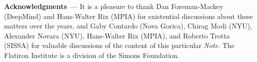 \documentclass{article}
\renewcommand{\paragraph}[1]{\bigskip\par\noindent\textbf{#1}~---}
\newcommand{\documentname}{\textsl{Note}}
\begin{document}
\paragraph{Acknowledgments}
It is a pleasure to thank
  Dan Foreman-Mackey (DeepMind) and
  Hans-Walter Rix (MPIA)
for existential discussions about these matters over the years, and
  Gaby Contardo (Nova Gorica),
  Chirag Modi (NYU),
  Alexander Novara (NYU),
  Hans-Walter Rix (MPIA), and
  Roberto Trotta (SISSA)
for valuable discussions of the content of this particular \documentname.
The Flatiron Institute is a division of the Simons Foundation.

\raggedright\footnotesize


\end{document}
